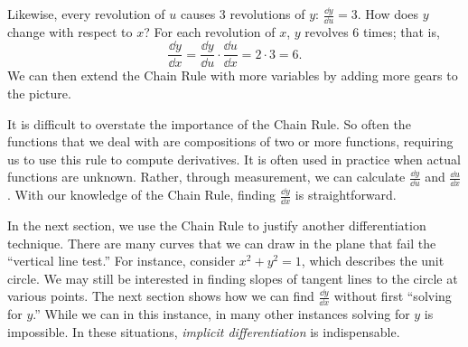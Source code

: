 Likewise, every revolution of $u$ causes 3 revolutions of $y$: $\frac{\dd y}{\dd u} = 3$. How does $y$ change with respect to $x$? For each revolution of $x$, $y$ revolves 6 times; that is,
\[\frac{\dd y}{\dd x} = \frac{\dd y}{\dd u}\cdot \frac{\dd u}{\dd x} = 2\cdot 3 = 6.\]
We can then extend the Chain Rule with more variables by adding more gears to the picture.\bigskip

It is difficult to overstate the importance of the Chain Rule. So often the functions that we deal with are compositions of two or more functions, requiring us to use this rule to compute derivatives. It is often used in practice when actual functions are unknown. Rather, through measurement, we can calculate $\frac{\dd y}{\dd u}$ and $\frac{\dd u}{\dd x}$. With our knowledge of the Chain Rule, finding $\frac{\dd y}{\dd x}$ is straightforward. 

In the next section, we use the Chain Rule to justify another differentiation technique. There are many curves that we can draw in the plane that fail the ``vertical line test.'' For instance, consider $x^2+y^2=1$, which describes the unit circle. We may still be interested in finding slopes of tangent lines to the circle at various points. The next section shows how we can find $\frac{\dd y}{\dd x}$ without first ``solving for $y$.'' While we can in this instance, in many other instances solving for $y$ is impossible. In these situations, \emph{implicit differentiation} is indispensable. 


